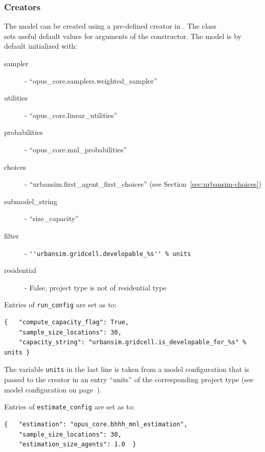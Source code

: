 \subsubsection{Creators}
%
The model can be created using a pre-defined creator in .
The class\\
  
sets useful default
values for arguments of the constructor. The model is by default initialized with:
\begin{description}
\item[sampler] - ``opus_core.samplers.weighted_sampler''
\item[utilities] - ``opus_core.linear_utilities''
\item[probabilities] - ``opus_core.mnl_probabilities''
\item[choices] - ``urbansim.first_agent_first_choices'' (see
  Section~\ref{sec:urbansim-choices})
\item[submodel_string] - ``size_capacity''
\item[filter] - \verb|''urbansim.gridcell.developable_%s'' % units|
\item[residential] - False, project type is not of residential type
\end{description}
Entries of \verb|run_config| are set as to:
\begin{verbatim}
{   "compute_capacity_flag": True,
    "sample_size_locations": 30,
    "capacity_string": "urbansim.gridcell.is_developable_for_%s" % units }
\end{verbatim}
The variable \variablesindex \verb|units| in the last line is taken from a model configuration
that is passed to the creator in an entry ``units'' of the corresponding
project type (see model configuration on
page~\pageref{page:model-configuration}).

Entries of \verb|estimate_config| are set as to:
\begin{verbatim}
{   "estimation": "opus_core.bhhh_mnl_estimation",
    "sample_size_locations": 30,
    "estimation_size_agents": 1.0  }
\end{verbatim}



